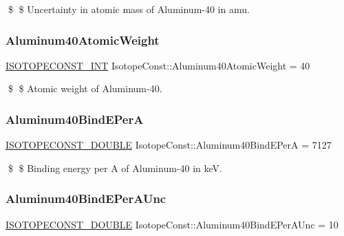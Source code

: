 \$ \$ Uncertainty in atomic mass of Aluminum-\/40 in amu. \mbox{\label{group___isotope_const-_aluminum-_al40_gac24a365b6ff85a44cf666b4a8a759599}} 
\subsubsection{\texorpdfstring{Aluminum40\+Atomic\+Weight}{Aluminum40AtomicWeight}}
{\footnotesize\ttfamily \mbox{\hyperlink{group___isotope_const-_macros_ga5f18360b3e99483a35c32d789e62621c}{I\+S\+O\+T\+O\+P\+E\+C\+O\+N\+S\+T\+\_\+\+I\+NT}} Isotope\+Const\+::\+Aluminum40\+Atomic\+Weight = 40}

\$ \$ Atomic weight of Aluminum-\/40. \mbox{\label{group___isotope_const-_aluminum-_al40_gad1c224a7a9f3865258701ca625fc150c}} 
\subsubsection{\texorpdfstring{Aluminum40\+Bind\+E\+PerA}{Aluminum40BindEPerA}}
{\footnotesize\ttfamily \mbox{\hyperlink{group___isotope_const-_macros_ga8f45a7272ce02c0b4c65c44636ed719a}{I\+S\+O\+T\+O\+P\+E\+C\+O\+N\+S\+T\+\_\+\+D\+O\+U\+B\+LE}} Isotope\+Const\+::\+Aluminum40\+Bind\+E\+PerA = 7127}

\$ \$ Binding energy per A of Aluminum-\/40 in keV. \mbox{\label{group___isotope_const-_aluminum-_al40_ga979cbe80333d8b08b200ea3bee7c79f6}} 
\subsubsection{\texorpdfstring{Aluminum40\+Bind\+E\+Per\+A\+Unc}{Aluminum40BindEPerAUnc}}
{\footnotesize\ttfamily \mbox{\hyperlink{group___isotope_const-_macros_ga8f45a7272ce02c0b4c65c44636ed719a}{I\+S\+O\+T\+O\+P\+E\+C\+O\+N\+S\+T\+\_\+\+D\+O\+U\+B\+LE}} Isotope\+Const\+::\+Aluminum40\+Bind\+E\+Per\+A\+Unc = 10}

